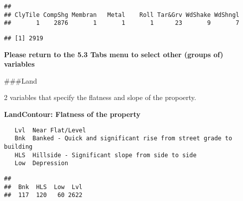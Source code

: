 \documentclass[]{article}
\newenvironment{Shaded}{\begin{snugshade}}{\end{snugshade}}
\newcommand{\CommentTok}[1]{\textcolor[rgb]{0.56,0.35,0.01}{\textit{#1}}}
\newcommand{\KeywordTok}[1]{\textcolor[rgb]{0.13,0.29,0.53}{\textbf{#1}}}
\newcommand{\NormalTok}[1]{#1}
\newcommand{\OperatorTok}[1]{\textcolor[rgb]{0.81,0.36,0.00}{\textbf{#1}}}
\newcommand{\StringTok}[1]{\textcolor[rgb]{0.31,0.60,0.02}{#1}}
\begin{document}
\begin{verbatim}
## 
## ClyTile CompShg Membran   Metal    Roll Tar&Grv WdShake WdShngl 
##       1    2876       1       1       1      23       9       7
\end{verbatim}

\begin{Shaded}
\end{Shaded}

\begin{verbatim}
## [1] 2919
\end{verbatim}

\textbf{Please return to the 5.3 Tabs menu to select other (groups of)
variables}

\#\#\#Land

2 variables that specify the flatness and slope of the propoerty.

\textbf{LandContour: Flatness of the property}

\begin{verbatim}
   Lvl  Near Flat/Level 
   Bnk  Banked - Quick and significant rise from street grade to building
   HLS  Hillside - Significant slope from side to side
   Low  Depression
\end{verbatim}

\begin{Shaded}
\end{Shaded}

\begin{verbatim}
## 
##  Bnk  HLS  Low  Lvl 
##  117  120   60 2622
\end{verbatim}

\begin{Shaded}
\end{Shaded}
\end{document}
